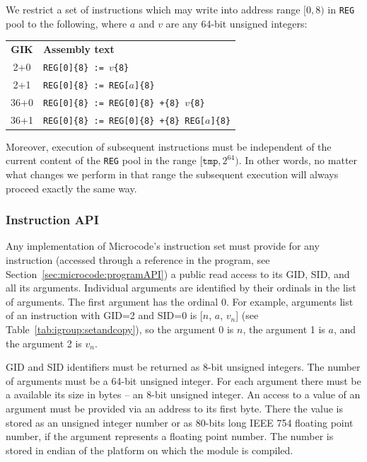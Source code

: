 \documentclass[10pt,twocolumn]{article}
\begin{document}
We restrict a set of instructions which may write into address range $ [0,8) $
in \texttt{REG} pool to the following, where $ a $ and $ v $ are any 64-bit unsigned
integers:
\begin{center}
\begin{tabular}{cl}
\textbf{GIK} & \textbf{Assembly text}
\\
2+0 & \texttt{REG[0]\{8\} := }$ v $\texttt{\{8\}}\\
2+1 & \texttt{REG[0]\{8\} := REG[}$ a $\texttt{]\{8\}}\\
36+0 & \texttt{REG[0]\{8\} := REG[0]\{8\} +\{8\} }$ v $\texttt{\{8\}}\\
36+1 & \texttt{REG[0]\{8\} := REG[0]\{8\} +\{8\} REG[}$ a $\texttt{]\{8\}}\\
\end{tabular}
\end{center}

\noindent Moreover, execution of subsequent instructions must be independent of
the current content of the \texttt{REG} pool in the range $
[\texttt{tmp},2^{64}) $. In other words, no matter what changes we perform in
that range the subsequent execution will always proceed exactly the same way.

\subsubsection{Instruction API}
\label{sec:microcode:instructionAPI}

Any implementation of Microcode's instruction set must provide for any
instruction (accessed through a reference in the program, see
Section~\ref{sec:microcode:programAPI}) a public read access to its GID, SID,
and all its arguments. Individual arguments are identified by their ordinals in
the list of arguments. The first argument has the ordinal 0. For example,
arguments list of an instruction with GID=2 and SID=0 is [$ n $, $ a $, $ v_n $]
(see Table~\ref{tab:igroup:setandcopy}), so the argument 0 is $ n $, the
argument 1 is $ a $, and the argument 2 is $ v_n $.

GID and SID identifiers must be returned as 8-bit unsigned integers. The number
of arguments must be a 64-bit unsigned integer. For each argument there must be
a available its size in bytes -- an 8-bit unsigned integer. An access to a value
of an argument must be provided via an address to its first byte. There the
value is stored as an unsigned integer number or as $ 80 $-bits long IEEE 754
floating point number, if the argument represents a floating point number. The
number is stored in endian of the platform on which the module is compiled.
\end{document}
